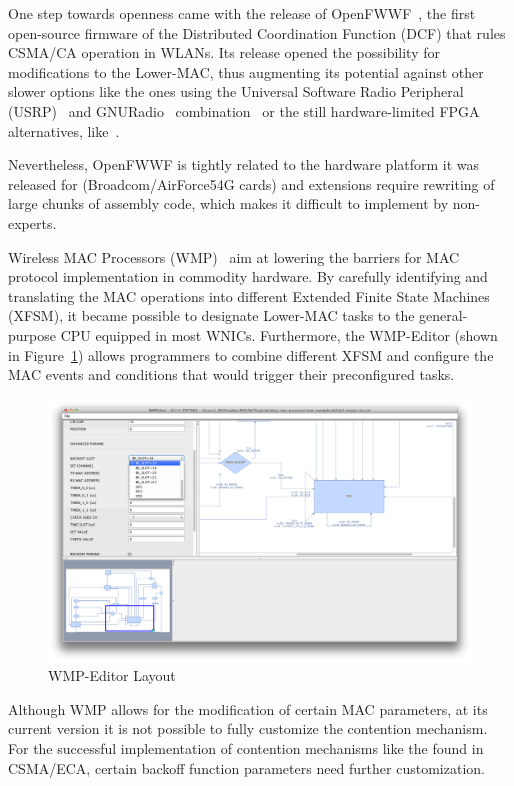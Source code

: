 One step towards openness came with the release of OpenFWWF~\cite{OpenFWWF}, the first open-source firmware of the Distributed Coordination Function (DCF) that rules CSMA/CA operation in WLANs. Its release opened the possibility for modifications to the Lower-MAC, thus augmenting its potential against other slower options like the ones using the Universal Software Radio Peripheral (USRP)~\cite{ettus2008universal} and GNURadio~\cite{blossom2004gnu} combination~\cite{tan2011sora} or the still hardware-limited FPGA alternatives, like~\cite{ng2010airblue}.

Nevertheless, OpenFWWF is tightly related to the hardware platform it was released for (Broadcom/AirForce54G cards) and extensions require rewriting of large chunks of assembly code, which makes it difficult to implement by non-experts.

Wireless MAC Processors (WMP)~\cite{WMP} aim at lowering the barriers for MAC protocol implementation in commodity hardware. By carefully identifying and translating the MAC operations into different Extended Finite State Machines (XFSM), it became possible to designate Lower-MAC tasks to the general-purpose CPU equipped in most WNICs. Furthermore, the WMP-Editor (shown in Figure~\ref{fig:WMPEditor}) allows programmers to combine different XFSM and configure the MAC events and conditions that would trigger their preconfigured tasks.


\begin{figure}[htbp]
  \centering
  \includegraphics[width=\linewidth]{WMP-EditorLayout.eps}
  \caption{WMP-Editor Layout
  \label{fig:WMPEditor}}
\end{figure}

Although WMP allows for the modification of certain MAC parameters, at its current version it is not possible to fully customize the contention mechanism. For the successful implementation of contention mechanisms like the found in CSMA/ECA, certain backoff function parameters need further customization.